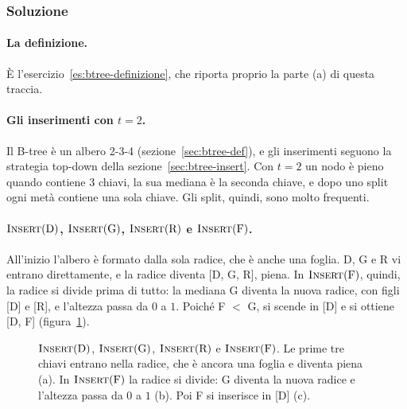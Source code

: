 \subsubsection*{Soluzione}

\paragraph{La definizione.}
È l'esercizio~\ref{es:btree-definizione}, che riporta proprio la parte (a) di questa traccia.

\paragraph{Gli inserimenti con $t = 2$.}
Il B-tree è un albero 2-3-4 (sezione~\ref{sec:btree-def}), e gli inserimenti seguono la strategia top-down della sezione~\ref{sec:btree-insert}. Con $t = 2$ un nodo è pieno quando contiene $3$ chiavi, la sua mediana è la seconda chiave, e dopo uno split ogni metà contiene una sola chiave. Gli split, quindi, sono molto frequenti.

\paragraph{$\textsc{Insert}(\mathrm{D})$, $\textsc{Insert}(\mathrm{G})$, $\textsc{Insert}(\mathrm{R})$ e $\textsc{Insert}(\mathrm{F})$.}
All'inizio l'albero è formato dalla sola radice, che è anche una foglia. D, G e R vi entrano direttamente, e la radice diventa [D, G, R], piena. In $\textsc{Insert}(\mathrm{F})$, quindi, la radice si divide prima di tutto: la mediana G diventa la nuova radice, con figli [D] e [R], e l'altezza passa da $0$ a $1$. Poiché F $<$ G, si scende in [D] e si ottiene [D, F] (figura~\ref{fig:es-btree21-DGRF}).

\begin{figure}[htbp]
\centering
{}
\caption{$\textsc{Insert}(\mathrm{D})$, $\textsc{Insert}(\mathrm{G})$, $\textsc{Insert}(\mathrm{R})$ e $\textsc{Insert}(\mathrm{F})$. Le prime tre chiavi entrano nella radice, che è ancora una foglia e diventa piena (a). In $\textsc{Insert}(\mathrm{F})$ la radice si divide: G diventa la nuova radice e l'altezza passa da $0$ a $1$ (b). Poi F si inserisce in [D] (c).}
\label{fig:es-btree21-DGRF}
\end{figure}

